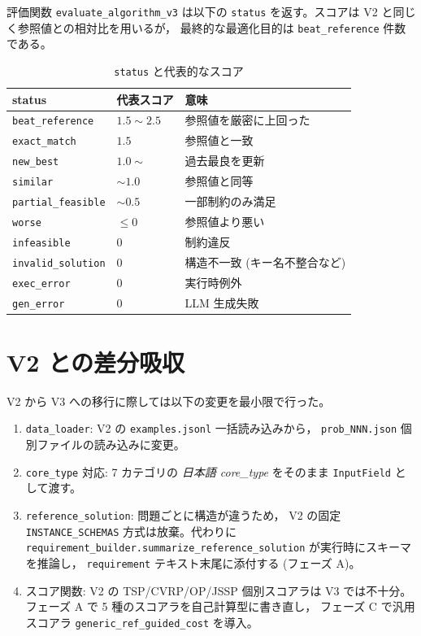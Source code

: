 \documentclass[uplatex,dvipdfmx,a4paper,11pt]{jsarticle}
\begin{document}
評価関数 \texttt{evaluate\_algorithm\_v3} は以下の \texttt{status}
を返す。スコアは V2 と同じく参照値との相対比を用いるが，
最終的な最適化目的は \texttt{beat\_reference} 件数である。

\begin{table}[htbp]
\centering\footnotesize
\caption{\texttt{status} と代表的なスコア}
\label{tab:status}
\begin{tabular}{@{}llp{7.5cm}@{}}
\toprule
status & 代表スコア & 意味 \\
\midrule
\texttt{beat\_reference} & $1.5\sim2.5$ & 参照値を厳密に上回った \\
\texttt{exact\_match}    & $1.5$ & 参照値と一致 \\
\texttt{new\_best}       & $1.0\sim$ & 過去最良を更新 \\
\texttt{similar}         & $\sim 1.0$ & 参照値と同等 \\
\texttt{partial\_feasible}& $\sim 0.5$ & 一部制約のみ満足 \\
\texttt{worse}           & $\leq 0$ & 参照値より悪い \\
\texttt{infeasible}      & $0$ & 制約違反 \\
\texttt{invalid\_solution}& $0$ & 構造不一致 (キー名不整合など) \\
\texttt{exec\_error}     & $0$ & 実行時例外 \\
\texttt{gen\_error}      & $0$ & LLM 生成失敗 \\
\bottomrule
\end{tabular}
\end{table}

\section{V2 との差分吸収}\label{sec:diff}

V2 から V3 への移行に際しては以下の変更を最小限で行った。

\begin{enumerate}
  \item \texttt{data\_loader}: V2 の \texttt{examples.jsonl} 一括読み込みから，
    \texttt{prob\_NNN.json} 個別ファイルの読み込みに変更。
  \item \texttt{core\_type} 対応: 7 カテゴリの
    \emph{日本語 core\_type} をそのまま \texttt{InputField} として渡す。
  \item \texttt{reference\_solution}: 問題ごとに構造が違うため，
    V2 の固定 \texttt{INSTANCE\_SCHEMAS} 方式は放棄。代わりに
    \texttt{requirement\_builder.summarize\_reference\_solution}
    が実行時にスキーマを推論し，
    \texttt{requirement} テキスト末尾に添付する (フェーズ A)。
  \item スコア関数: V2 の TSP/CVRP/OP/JSSP 個別スコアラは V3 では不十分。
    フェーズ A で 5 種のスコアラを自己計算型に書き直し，
    フェーズ C で汎用スコアラ \texttt{generic\_ref\_guided\_cost} を導入。
\end{enumerate}
\end{document}
